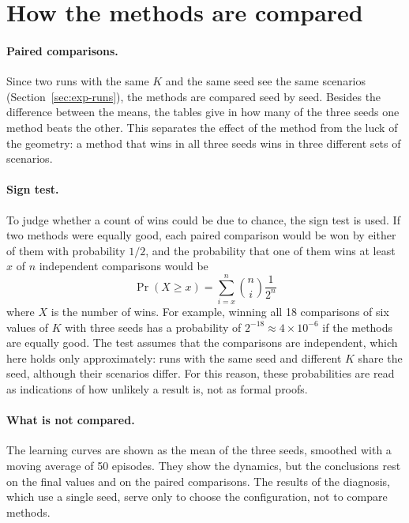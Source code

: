 \section{How the methods are compared}
\label{sec:exp-comparisons}

\paragraph{Paired comparisons.} Since two runs with the same $K$ and the same seed see the same scenarios
(Section~\ref{sec:exp-runs}), the methods are compared seed by seed. Besides the difference between the means,
the tables give in how many of the three seeds one method beats the other. This separates the effect of the
method from the luck of the geometry: a method that wins in all three seeds wins in three different sets of
scenarios.

\paragraph{Sign test.} To judge whether a count of wins could be due to chance, the sign test is used. If two
methods were equally good, each paired comparison would be won by either of them with probability $1/2$, and
the probability that one of them wins at least $x$ of $n$ independent comparisons would be
\begin{equation}
  \Pr(X \ge x) = \sum_{i = x}^{n} \binom{n}{i} \frac{1}{2^{n}}
  \label{eq:exp-sign-test}
\end{equation}
where $X$ is the number of wins. For example, winning all 18 comparisons of six values of $K$ with three seeds
has a probability of $2^{-18} \approx 4 \times 10^{-6}$ if the methods are equally good. The test assumes
that the comparisons are independent, which here holds only approximately: runs with the same seed and
different $K$ share the seed, although their scenarios differ. For this reason, these probabilities are read
as indications of how unlikely a result is, not as formal proofs.

\paragraph{What is not compared.} The learning curves are shown as the mean of the three seeds, smoothed with
a moving average of 50 episodes. They show the dynamics, but the conclusions rest on the final values and on
the paired comparisons. The results of the diagnosis, which use a single seed, serve only to choose the
configuration, not to compare methods.
